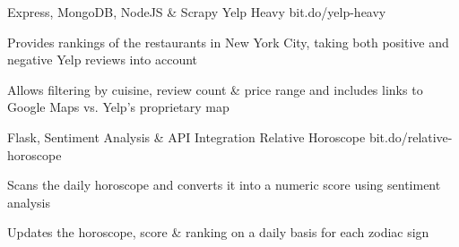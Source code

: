 

\begin{cventries}

 \cventry
    {Express, MongoDB, NodeJS \& Scrapy} %
    {Yelp Heavy} %
    {bit.do/yelp-heavy} %
    {} %
    {
      \begin{cvitems} %
        \item {Provides rankings of the restaurants in New York City, taking both positive and negative Yelp reviews into account}
        \item {Allows filtering by cuisine, review count \& price range and includes links to Google Maps vs. Yelp's proprietary map}
      \end{cvitems}
    }

 \cventry
    {Flask, Sentiment Analysis \& API Integration} %
    {Relative Horoscope} %
    {bit.do/relative-horoscope} %
    {} %
    {
      \begin{cvitems} %
        \item {Scans the daily horoscope and converts it into a numeric score using sentiment analysis}
        \item {Updates the horoscope, score \& ranking on a daily basis for each zodiac sign}
      \end{cvitems}
    }

\end{cventries}